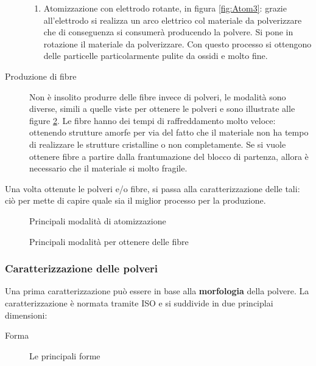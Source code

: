 \begin{description}
\begin{enumerate}
	\item Atomizzazione con elettrodo rotante, in figura \ref{fig:Atom3}: grazie all'elettrodo si realizza un arco elettrico col materiale da polverizzare che di conseguenza si consumerà producendo la polvere. Si pone in rotazione il materiale da polverizzare. Con questo processo si ottengono delle particelle particolarmente pulite da ossidi e molto fine.
	\end{enumerate}
\item[Produzione di fibre] Non è insolito produrre delle fibre invece di polveri, le modalità sono diverse, simili a quelle viste per ottenere le polveri e sono illustrate alle figure \ref{fig:Fiber}. Le fibre hanno dei tempi di raffreddamento molto veloce: ottenendo strutture amorfe per via del fatto che il materiale non ha tempo di realizzare le strutture cristalline o non completamente.
Se si vuole ottenere fibre a partire dalla frantumazione del blocco di partenza, allora è necessario che il materiale si molto fragile.
\end{description}

Una volta ottenute le polveri e/o fibre, si passa alla caratterizzazione delle tali: ciò per mette di capire quale sia il miglior processo per la produzione.

\begin{figure}
\centering
{}\:
\:
\caption{Principali modalità di atomizzazione}
\label{fig:Atom}
\end{figure}

\begin{figure}
\centering
{}\:
\:
\caption{Principali modalità per ottenere delle fibre}
\label{fig:Fiber}
\end{figure}

\subsubsection{Caratterizzazione delle polveri}
Una prima caratterizzazione può essere in base alla \textbf{morfologia} della polvere.
La caratterizzazione è normata tramite ISO e si suddivide in due principlai dimensioni:
\begin{description}
\item[Forma] Le principali forme
\end{description}